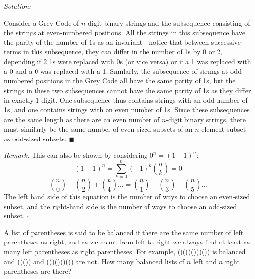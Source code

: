 \documentclass[12pt]{scrartcl}
\newenvironment{problem}[2][Problem]{\begin{trivlist}
\item[\hskip \labelsep {\bfseries #1}\hskip \labelsep {\bfseries #2.}]}{\end{trivlist}}
\newenvironment{solution}
    {\emph{Solution:}
    }
    {
    \qedhere
    }
\begin{document}
\begin{solution}
\begin{enumerate}[label=(\alph*)]
Consider a Grey Code of $n$-digit binary strings and the subsequence consisting of the strings at even-numbered positions. All the strings in this subsequence have the parity of the number of $1$s as an invariant - notice that between successive terms in this subsequence, they can differ in the number of 1s by $0$ or $2$, depending if $2$ 1s were replaced with 0s (or vice versa) or if a 1 was replaced with a 0 and a 0 was replaced with a 1. Similarly, the subsequence of strings at odd-numbered positions in the Grey Code all have the same parity of 1s, but the strings in these two subsequences cannot have the same parity of 1s as they differ in exactly 1 digit. One subsequence thus contains strings with an odd number of 1s, and one contains strings with an even number of 1s. Since these subsequences are the same length as there are an even number of $n$-digit binary strings, there must similarly be the same number of even-sized subsets of an $n$-element subset as odd-sized subsets. $\blacksquare$ 

\textit{Remark. } This can also be shown by considering $0^n = (1-1)^n$: 
\[
	(1-1)^n = \sum_{k=0}^n (-1)^k \binom{n}{k} = 0
\]
\[
	\binom{n}{0} + \binom{n}{2} + \binom{n}{4} \ldots = \binom{n}{1} + \binom{n}{3} + \binom{n}{5} \ldots
\]
The left hand side of this equation is the number of ways to choose an even-sized subset, and the right-hand side is the number of ways to choose an odd-sized subset. $\square$
\end{enumerate}
\end{solution}

% 

\begin{problem}{4}
A list of parentheses is said to be balanced if there are the same number of left parentheses as right, and as we count from left to right we always find at least as many left parentheses as right parentheses. For example, (((()()))()) is balanced and ((()) and (()()))(() are not. How many balanced lists of $n$ left and $n$ right parentheses are there? 
\end{problem}
\end{document}
